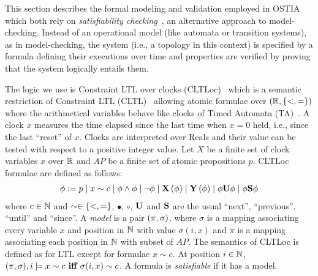 


This section describes the formal modeling and validation employed in OSTIA  which both rely on \textit{satisfiability checking}~\cite{MPS13}, an alternative approach to model-checking.
Instead of an operational model (like automata or transition systems), as in model-checking, 
the system (i.e., a topology in this context) is specified by a formula defining their executions over time and properties are verified by proving that the system logically entails them.

The logic we use is Constraint LTL over clocks (CLTLoc)~\cite{BRS15} which is a semantic restriction of Constraint LTL (CLTL)~\cite{DD07} allowing atomic formulae over $(\mathbb{R}, \{ <,= \})$ where the arithmetical variables behave like clocks of Timed Automata (TA)~\cite{Alur&Dill94}.
A clock $x$ measures the time elapsed since the last time when $x=0$ held, i.e., since the last ``reset'' of $x$.
Clocks are interpreted over Reals and their value can be tested with respect to a positive integer value.
%
Let $X$ be a finite set of clock variables $x$ over $\mathbb{R}$ and $AP$ be a finite set of atomic propositions $p$.
CLTLoc formulae are defined as follows:
\begin{equation*}%
  \phi :=
  \begin{gathered}
    p \mid x\sim c \mid \phi \wedge \phi \mid \neg \phi \mid
   \X{\phi} \mid \Y{\phi} %
\mid \phi\U\phi \mid \phi\Snc\phi
  \end{gathered}
\end{equation*}
where %
$c \in \mathbb{N}$ and $\sim \in \{ <,= \}$, $\bullet$, $\circ$, $\mathbf{U}$ and $\mathbf{S}$ are the usual ``next'', ``previous'', ``until'' and ``since''.
A \textit{model} is a pair $(\pi, \sigma)$, where $\sigma$ is a mapping associating every variable $x$ and position in $\mathbb{N}$ with value $\sigma(i,x)$ and $\pi$ is a mapping associating each position in $\mathbb{N}$ with subset of $AP$. 
The semantics of CLTLoc is defined as for LTL except for formulae $x\sim c$. 
At position $i\in\mathbb{N}$, $ (\pi, \sigma), i \models x\sim c \textbf{ iff }  \sigma(i, x)\sim c$.
A formula is \textit{satisfiable} if it has a model.

